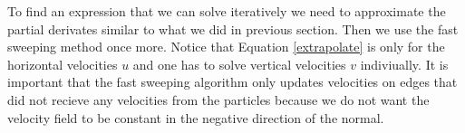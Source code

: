 To find an expression that we can solve iteratively we need to approximate the partial derivates similar to what we did in previous section. Then we use the fast sweeping method once more. Notice that Equation \ref{extrapolate} is only for the horizontal velocities $u$ and one has to solve vertical velocities $v$ indiviually. It is important that the fast sweeping algorithm only updates velocities on edges that did not recieve any velocities from the particles because we do not want the velocity field to be constant in the negative direction of the normal.
